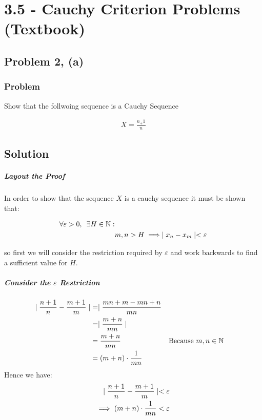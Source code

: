 \documentclass[class=article, crop=false]{standalone}
\begin{document}
\chapter{3.5 - Cauchy Criterion Problems (Textbook)}
\section{Problem 2, (a)}
\subsection{Problem}
Show that the follwoing sequence is a Cauchy Sequence

\begin{align}
X = \frac{n_+1}{n}
  \label{inprob}
\end{align}


\section{Solution}
\paragraph{Layout the Proof}
In order to show that  the sequence $X$ is a cauchy sequence it must be shown that:

\begin{align}
  \forall \varepsilon > 0, \enspace \exists H\in \mathbb{N} :& \notag \\
  &m,n > H \implies \mid x_{n} - x_{m} \mid < \varepsilon
  \label{cauchdef}
\end{align}

so first we will consider the restriction required by $\varepsilon$ and work backwards to find a sufficient value for $H$.

\paragraph{Consider the $\varepsilon$ Restriction}
\begin{align}
  \mid \frac{n+1}{n} - \frac{m+1}{m} \mid &= \mid \frac{mn+m-mn+n}{mn} \notag \\
  &= \mid \frac{m+n}{mn} \mid \notag \\
  & = \frac{m+n}{mn} && \text{Because $m,n \in \mathbb{N}$} \notag \\
  &= \left( m+n \right) \cdot \frac{1}{mn}
  \label{finalform}
\end{align}
Hence we have:
\begin{align}
  \mid \frac{n+1}{n} - \frac{m+1}{m} \mid < \varepsilon \notag \\
  \implies  \left( m+n \right) \cdot \frac{1}{mn} < \varepsilon
  \label{epsrestfin}
\end{align}
\end{document}
